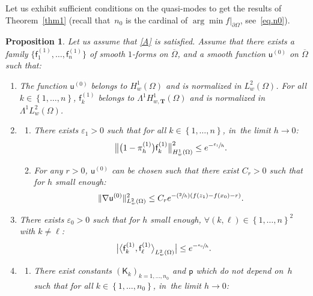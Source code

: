 \documentclass[JEP,XML,SOM,Unicode,NoEqCountersInSection,NoFloatCountersInSection,published]{cedram}
\newcommand{\Psfrac}[2]{(\sfrac{#1}{#2})}
\newcommand{\mbf}[1]{\mathbf{#1}}
\let\lp\langle
\let\rp\rangle
\let\ve\varepsilon
\theoremstyle{plain}
\newtheorem{proposition}{Proposition}
\theoremstyle{definition}
\begin{document}
\label{sec.strategy0}

Let us exhibit sufficient conditions on the quasi-modes to get the
results of Theorem~\ref{thm1} (recall that~$n_0$ is the cardinal of
$\arg\min f|_{\partial \Omega}$, see~\eqref{eq.n0}).

\begin{proposition} \label{ESTIME}
Let us assume that \ref{A} is satisfied.
Assume that there exists a family $\{\mathsf f_1^{(1)}, \ldots,
\mathsf f_n^{(1)}\} $ of smooth $1$-forms on $\overline \Omega$, and
a smooth function $\mathsf u^{(0)}$ on $\overline \Omega$ such that:
\begin{enumerate}
\item\label{ESTIME1}
The function $\mathsf u^{(0)}$ belongs to $H^1_w(\Omega)$ and is normalized in $L^2_w(\Omega)$.
For all $ k\in \left\{1,\ldots,n\right\}$, $\mathsf f_k^{(1)}$
belongs to $\Lambda^1H^1_{w,\mbf T}(\Omega)$ and is normalized in $\Lambda^1L^2_w(\Omega)$.
\item\mbox{}
\begin{enumerate}
\item\label{ESTIME2a}
There exists $\ve_1>0$ such that for all $ k\in \left\{1,\ldots,n\right\}$, in~the limit $h\to 0$:
\begin{equation}\label{eq:assump_2a_psi}
\big \| \bigl(1-\pi_h^{(1)}\bigr) \mathsf f_k^{(1)} \big \|_{H^1_{w}(\Omega)}^2 \le e^{-\sfrac{\ve_1}{h}}.
\end{equation}
\item\label{ESTIME2b}
For any $r>0$, $\mathsf u^{(0)}$ can be chosen such that there exist $C_r>0$ such that for $h$ small enough:
\[
\| \nabla \mathsf u^{(0)}\|_{L^2_w(\Omega)}^2 \le C_r e^{-\Psfrac{2}{h}(f(z_1)-f(x_0) - r)}.
\]
\end{enumerate}
\item\label{ESTIME3}
There exists $\ve_0>0$ such that for $h$ small enough, $\forall (k,\ell)
\in \left\{1,\ldots,n\right\}^2$ with $k\neq \ell$:
\[
\big\vert \big\lp\mathsf f_k^{(1)}, \mathsf f_\ell^{(1)}\big\rp_{L^2_w(\Omega)}\big\vert \le e^{-\sfrac{\ve_0}{h}}.
\]
\item\mbox{}\label{ESTIME4}
\begin{enumerate}
\item\label{ESTIME4a}
There exist constants
$(\mathsf K_k)_{k=1,\ldots,n_0}$ and $\mathsf p$ which do not depend on~$h$ such that for all $k\in \left\{1,\ldots,n_0\right\}$, in~the limit $h\to 0$:

\end{enumerate}
\end{enumerate}
\end{proposition}
\end{document}
